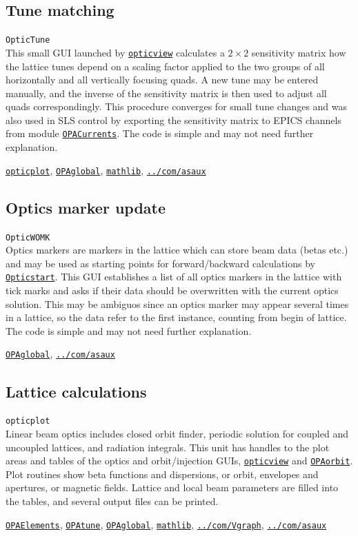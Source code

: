 \documentclass[12pt]{article}
\newcommand\code[1]{{\tt #1}}
\newcommand{\opagui}[1]{\colorbox{blue!20}{\code{#1}}}
\newcommand{\oguih}[2]{\subsection{\label{#2}#1}{\Huge\opagui{#2}}\\}
\newcommand{\ogui}[1]{\hyperref[#1]{\opagui{#1}}}
\newcommand{\opaguif}[1]{\colorbox{violet!30}{\code{#1}}}
\newcommand{\oguif}[1]{\hyperref[#1]{\opaguif{#1}}}
\newcommand{\opauni}[1]{\colorbox{orange!30}{\code{#1}}}
\newcommand{\ounih}[2]{\subsection{\label{#2}#1}{\Huge\opauni{#2}}\\}
\newcommand{\ouni}[1]{\hyperref[#1]{\opauni{#1}}}
\newcommand{\uses}[1]{\flushleft {\bf Uses:} #1}
\newcommand{\desc}[1]{#1}
\begin{document}
\oguih{Tune matching}{OpticTune} 

This small GUI launched by \ogui{opticview} calculates a $2\times 2$ sensitivity matrix how the lattice tunes depend on a scaling factor applied to the two groups of all horizontally and all vertically focusing quads. A new tune may be entered manually, and the inverse of the sensitivity matrix is then used to adjust all quads correspondingly. This procedure converges for small tune changes and was also used in SLS control by exporting the sensitivity matrix to EPICS channels from module \ogui{OPACurrents}. The code is simple and may not need further explanation.

\uses{\ouni{opticplot}, \ouni{OPAglobal}, \ouni{mathlib}, \ouni{../com/asaux}} 


\oguih{Optics marker update}{OpticWOMK} 
\desc{Optics markers are markers in the lattice which can store beam data (betas etc.) and may be used as starting points for forward/backward calculations by \ogui{Opticstart}. This GUI establishes a list of all optics markers in the lattice with tick marks and asks if their data should be overwritten with the current optics solution. This may be ambiguos since an optics marker may appear several times in a lattice, so the data refer to the first instance, counting from begin of lattice. The code is simple and may not need further explanation.}

\uses{\ouni{OPAglobal}, \ouni{../com/asaux}} 




\ounih{Lattice calculations}{opticplot} 

\desc{Linear beam optics includes closed orbit finder, periodic solution for coupled and uncoupled lattices, and radiation integrals. 
This unit has handles to the plot areas and tables of the optics and orbit/injection GUIs, \ogui{opticview} and \ogui{OPAorbit}.
Plot routines show beta functions and dispersions, or orbit, envelopes and apertures, or magnetic fields. Lattice and local beam parameters are filled into the tables, and several output files can be printed. 
}


\uses{
 \ouni{OPAElements}, \ogui{OPAtune}, \ouni{OPAglobal}, \ouni{mathlib}, \oguif{../com/Vgraph}, \ouni{../com/asaux}}
\end{document}
